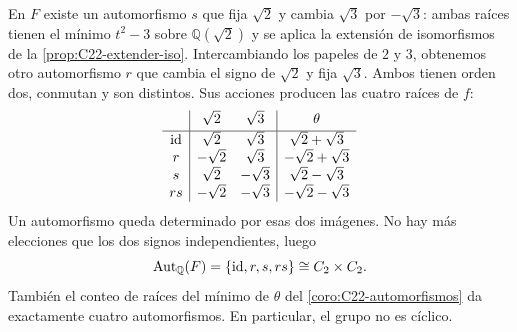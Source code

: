En $F$ existe un automorfismo $s$ que fija $\sqrt2$ y cambia $\sqrt3$ por $-\sqrt3$: ambas raíces tienen el mínimo $t^2-3$ sobre $\mathbb Q(\sqrt2)$ y se aplica la extensión de isomorfismos de la \cref{prop:C22-extender-iso}. Intercambiando los papeles de $2$ y $3$, obtenemos otro automorfismo $r$ que cambia el signo de $\sqrt2$ y fija $\sqrt3$. Ambos tienen orden dos, conmutan y son distintos. Sus acciones producen las cuatro raíces de $f$:
\begingroup
\renewcommand{\arraystretch}{1.2}
\[
\begin{array}{c|cc|c}
&\sqrt2&\sqrt3&\theta\\[2pt]\hline
\operatorname{id}&\sqrt2&\sqrt3&\sqrt2+\sqrt3\\
r&-\sqrt2&\sqrt3&-\sqrt2+\sqrt3\\
s&\sqrt2&-\sqrt3&\sqrt2-\sqrt3\\
rs&-\sqrt2&-\sqrt3&-\sqrt2-\sqrt3
\end{array}
\]
\endgroup
Un automorfismo queda determinado por esas dos imágenes. No hay más elecciones que los dos signos independientes, luego
\[
\operatorname{Aut}_{\mathbb Q}(F)=\{\operatorname{id},r,s,rs\}\cong C_2\times C_2.
\]
También el conteo de raíces del mínimo de $\theta$ del \cref{coro:C22-automorfismos} da exactamente cuatro automorfismos. En particular, el grupo no es cíclico.

